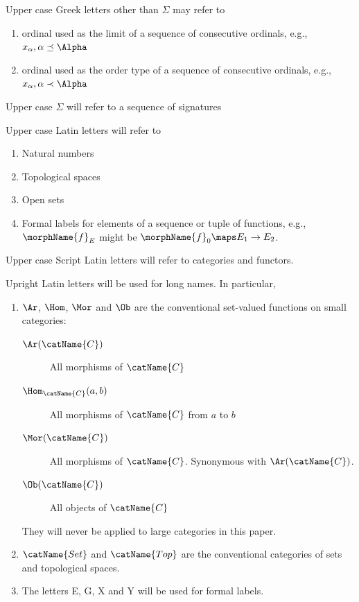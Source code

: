 \documentclass{article}
\begin{document}
Upper case Greek letters other than $\Sigma$ may refer to
\begin{enumerate}
\item ordinal used as the limit of a sequence of consecutive ordinals,
e.g., $x_\alpha, \alpha \preceq \Alpha$
\item ordinal used as the order type of a sequence of consecutive
ordinals, e.g., $x_\alpha, \alpha \prec \Alpha$
\end{enumerate}

Upper case $\Sigma$ will refer to a sequence of signatures

Upper case Latin letters will refer to
\begin{enumerate}
\item Natural numbers
\item Topological spaces
\item Open sets
\item Formal labels for elements of a sequence or tuple of functions,
e.g., $\morphName{f}_E$ might be $\morphName{f}_0 \maps E_1 \to E_2$.
\end{enumerate}

Upper case Script Latin letters will refer to categories and functors.

Upright Latin letters will be used for long names.
In particular,
\begin{enumerate}
\item
$\Ar$, $\Hom$, $\Mor$ and $\Ob$ are the conventional set-valued
functions on small categories:

\begin{description}
\item[$\Ar(\catName{C})$]
All morphisms of $\catName{C}$
\item[$\Hom_{\catName{C}}(a,b)$]
All morphisms of $\catName{C}$ from $a$ to $b$
\item[$\Mor(\catName{C})$]
All morphisms of $\catName{C}$.
Synonymous with $\Ar(\catName{C})$.
\item[$\Ob(\catName{C})$]
All objects of $\catName{C}$
\end{description}

They will never be applied to large categories in this paper.

\item
$\catName{Set}$ and $\catName{Top}$ are the conventional categories of sets and
topological spaces.

\item
The letters E, G, X and Y will be used for formal labels.
\end{enumerate}
\end{document}
